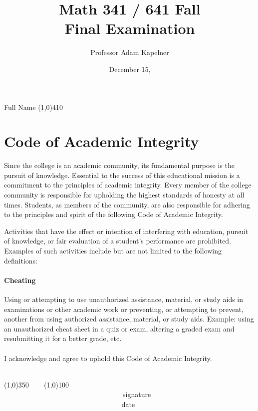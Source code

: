 \documentclass[12pt]{article}
\title{Math 341 / 641 Fall \the\year{} \\ Final Examination}
\author{Professor Adam Kapelner}
\date{December 15, \the\year{}}
\begin{document}
\maketitle

\noindent Full Name \line(1,0){410}

\thispagestyle{empty}

\section*{Code of Academic Integrity}

\footnotesize
Since the college is an academic community, its fundamental purpose is the pursuit of knowledge. Essential to the success of this educational mission is a commitment to the principles of academic integrity. Every member of the college community is responsible for upholding the highest standards of honesty at all times. Students, as members of the community, are also responsible for adhering to the principles and spirit of the following Code of Academic Integrity.

Activities that have the effect or intention of interfering with education, pursuit of knowledge, or fair evaluation of a student's performance are prohibited. Examples of such activities include but are not limited to the following definitions:

\paragraph{Cheating} Using or attempting to use unauthorized assistance, material, or study aids in examinations or other academic work or preventing, or attempting to prevent, another from using authorized assistance, material, or study aids. Example: using an unauthorized cheat sheet in a quiz or exam, altering a graded exam and resubmitting it for a better grade, etc.\\
\\
\noindent I acknowledge and agree to uphold this Code of Academic Integrity. \\~\\

\begin{center}
\line(1,0){350} ~~~ \line(1,0){100}\\
~~~~~~~~~~~~~~~~~~~~~~~~~~~~~~~~~~signature~~~~~~~~~~~~~~~~~~~~~~~~~~~~~~~~~~~~~~~~~~~~~~~~~~~~~~~~~~~~~~ date
\end{center}

\normalsize
\end{document}
